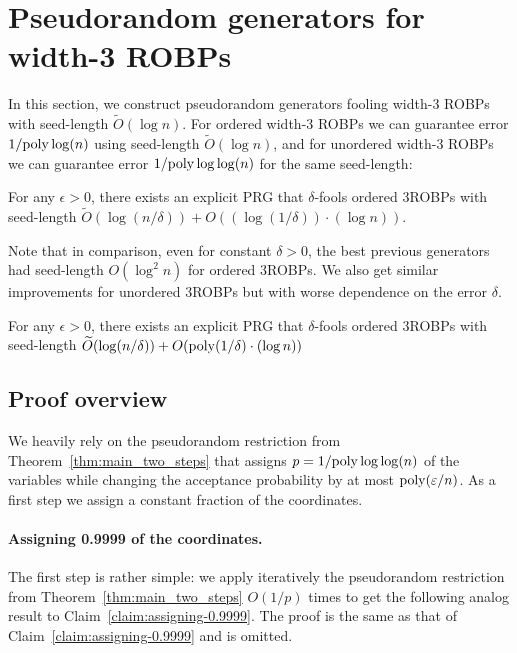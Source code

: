 
\newcommand{\mE}{{\mathcal{E}}}
\newcommand{\BRRY}{{\mathbf{BRRY}}}
\newcommand{\Col}{{\mathsf{Col}}}
\newcommand{\FCol}{{\mathsf{FCol}}}

\section{Pseudorandom generators for width-3 ROBPs}

In this section, we construct pseudorandom generators fooling width-3 ROBPs with seed-length $\tilde{O}(\log n)$. For ordered width-3 ROBPs we can guarantee error $1/{\mathrm{poly}}\log(n)$ using seed-length $\tilde{O}(\log n)$, and for unordered width-3  ROBPs we can guarantee error $1/{\mathrm{poly}}\log\log(n)$ for the same seed-length:

\begin{theorem}\label{thm:main-3ROBP-ordered}
For any $\epsilon > 0$, there exists an explicit PRG that $\delta$-fools ordered 3ROBPs with seed-length $\tilde{O}(\log(n/\delta)) + O((\log(1/\delta)) \cdot (\log n))$. 
\end{theorem}

Note that in comparison, even for constant $\delta > 0$, the best previous generators had seed-length $O(\log^2 n)$ for ordered 3ROBPs. We also get similar improvements for unordered 3ROBPs but with worse dependence on the error $\delta$. 

\begin{theorem}\label{thm:main-3ROBP-unordered}
For any $\epsilon > 0$, there exists an explicit PRG that $\delta$-fools ordered 3ROBPs with seed-length $\widetilde{O}(\log(n/\delta)) + O( {\mathrm{poly}}(1/\delta) \cdot (\log n))$
\end{theorem}



\subsection{Proof overview}


We heavily rely on the pseudorandom restriction from Theorem~\ref{thm:main_two_steps} that assigns $p = 1/{\mathrm{poly}} \log \log (n)$ of the variables while changing the acceptance probability by at most ${\mathrm{poly}}(\varepsilon/n)$. As a first step we assign a constant fraction of the coordinates.

\paragraph{Assigning 0.9999 of the coordinates.} The first step is rather simple: we apply iteratively the pseudorandom restriction from Theorem~\ref{thm:main_two_steps} $O(1/p)$ times to get the following analog result to Claim~\ref{claim:assigning-0.9999}.
The proof is the same as that of Claim~\ref{claim:assigning-0.9999} and is omitted.

